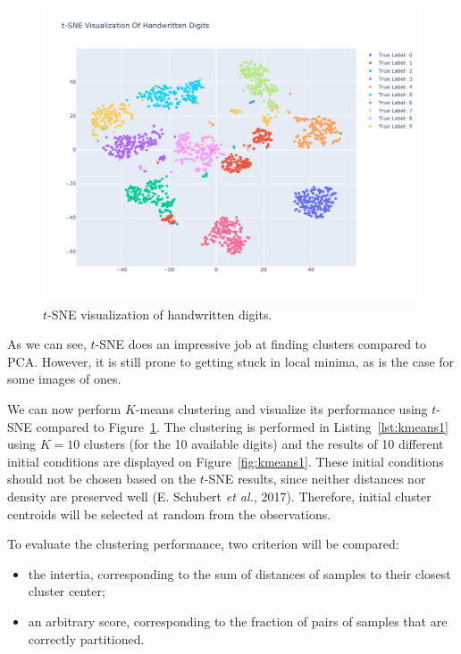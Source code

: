 \documentclass[12pt]{article}
\begin{document}
  \begin{figure}[!ht]
    \centering
    \includegraphics[width=\textwidth]{figures/digitstsne}
    \caption{$t$-SNE visualization of handwritten digits.}%
    \label{fig:digitstsne}
  \end{figure} 

  As we can see, $t$-SNE does an impressive job at finding clusters compared to
  PCA\@. However, it is still prone to getting stuck in local minima, as is the
  case for some images of ones.

  We can now perform $K$-means clustering and visualize its performance using
  $t$-SNE compared to Figure~\ref{fig:digitstsne}. The clustering is performed
  in Listing~\ref{lst:kmeans1} using $K = 10$ clusters (for the 10 available
  digits) and the results of 10 different initial conditions are displayed on
  Figure~\ref{fig:kmeans1}.  These initial conditions should not be chosen
  based on the $t$-SNE results, since neither distances nor density are
  preserved well (E. Schubert \textit{et al.}, 2017).  Therefore, initial
  cluster centroids will be selected at random from the observations. 

  To evaluate the clustering performance, two criterion will be compared:
  \begin{itemize}
    \item the intertia, corresponding to the sum of distances of samples to
      their closest cluster center;
    \item an arbitrary score, corresponding to the fraction of pairs of samples
      that are correctly partitioned.
  \end{itemize}
\end{document}
